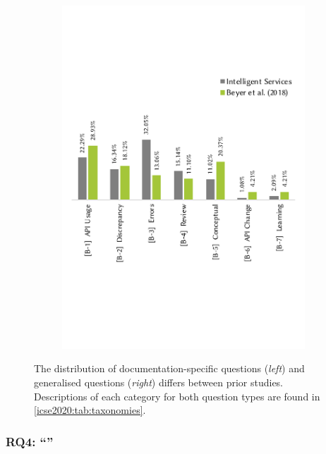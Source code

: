 \begin{figure}[h]
  \hfill
  \begin{subfigure}[c]{0.49\linewidth}
    \centering
    \includegraphics[width=\linewidth]{mainmatter/publications/figures/icse2020/b-compare.pdf}
  \end{subfigure}
    \centering
    \caption{The distribution of documentation-specific questions (\textit{left}) and generalised questions (\textit{right}) differs between prior studies. Descriptions of each category for both question types are found in \cref{icse2020:tab:taxonomies}.}
    \label{fig:conclusion:question-diff}
\end{figure}

\subsubsection[Answering RQ4]{RQ4: ``\RQFourDesign{}''}

